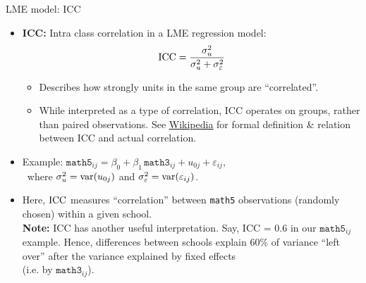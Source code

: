 \documentclass{beamer}
\begin{document}
\begin{frame}{LME model: ICC}
\small
\begin{itemize}
\item \textbf{ICC:} Intra class correlation in a LME regression model: \qquad
$$ \textnormal{ICC}=\frac{\sigma^2_u}{\sigma^2_u + \sigma^2_{\varepsilon}} $$
\begin{itemize}
    \item Describes how strongly units in the same group are ``correlated''.
    \item While interpreted as a type of correlation, ICC operates on groups, rather than paired observations. See \textcolor{blue}{\underline{\href{https://en.wikipedia.org/wiki/Intraclass_correlation}{Wikipedia}}} for formal definition \& relation between ICC and actual correlation.
\end{itemize}
\medskip
\item Example: \qquad $\texttt{math5}_{ij} = \beta_{0} + \beta_1 \, \texttt{math3}_{ij} + u_{0j} + \varepsilon_{ij},$\\ \medskip
\qquad \qquad \qquad ~where $\sigma^2_u = \textnormal{var}(u_{0j})$ and $\sigma^2_{\varepsilon} = \textnormal{var}(\varepsilon_{ij})$.\\ \smallskip
\medskip
\item Here, $\textnormal{ICC}$  measures ``correlation'' between \texttt{math5}  observations (randomly chosen) within a given school.\\ \smallskip \textbf{Note:} ICC has another useful interpretation. Say, ICC = 0.6 in our $\texttt{math5}_{ij}$ example. Hence, differences between schools explain 60\% of variance ``left over'' after the variance explained by fixed effects \\(i.e. by $\texttt{math3}_{ij}$).
\end{itemize}
\end{frame}
\end{document}
